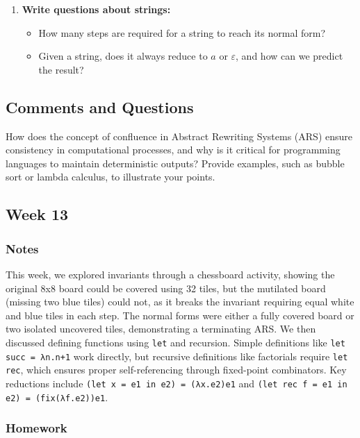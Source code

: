 \documentclass{article}
\theoremstyle{theorem}
\theoremstyle{definition}
\theoremstyle{remark}
\begin{document}
\begin{enumerate}
    \item \textbf{Write questions about strings:}
        \begin{itemize}
            \item How many steps are required for a string to reach its normal form?
            \item Given a string, does it always reduce to \( a \) or \( \varepsilon \), and how can we predict the result?
        \end{itemize}
\end{enumerate}


\subsection*{Comments and Questions}

How does the concept of confluence in Abstract Rewriting Systems (ARS) ensure consistency in computational processes, and why is it critical for programming languages to maintain deterministic outputs? Provide examples, such as bubble sort or lambda calculus, to illustrate your points.

\subsection{Week 13}

\subsubsection*{Notes}
This week, we explored invariants through a chessboard activity, showing the original 8x8 board could be covered using 32 tiles, but the mutilated board (missing two blue tiles) could not, as it breaks the invariant requiring equal white and blue tiles in each step. The normal forms were either a fully covered board or two isolated uncovered tiles, demonstrating a terminating ARS. We then discussed defining functions using \texttt{let} and recursion. Simple definitions like \texttt{let succ = λn.n+1} work directly, but recursive definitions like factorials require \texttt{let rec}, which ensures proper self-referencing through fixed-point combinators. Key reductions include \texttt{(let x = e1 in e2) = (λx.e2)e1} and \texttt{(let rec f = e1 in e2) = (fix(λf.e2))e1}.

\subsubsection*{Homework}
\end{document}
